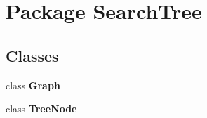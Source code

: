 \section{Package Search\+Tree}
\label{namespace_search_tree}
\subsection*{Classes}
\begin{DoxyCompactItemize}
\item 
class {\bf Graph}
\item 
class {\bf Tree\+Node}
\end{DoxyCompactItemize}
